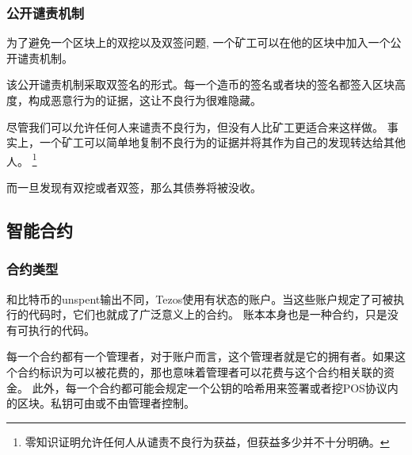 \documentclass[letterpaper]{article}
\begin{document}
\subsubsection{公开谴责机制}
为了避免一个区块上的双挖以及双签问题, 一个矿工可以在他的区块中加入一个公开谴责机制。

该公开谴责机制采取双签名的形式。每一个造币的签名或者块的签名都签入区块高度，构成恶意行为的证据，这让不良行为很难隐藏。

尽管我们可以允许任何人来谴责不良行为，但没有人比矿工更适合来这样做。
事实上，一个矿工可以简单地复制不良行为的证据并将其作为自己的发现转达给其他人。
\footnote{零知识证明允许任何人从谴责不良行为获益，但获益多少并不十分明确。}

而一旦发现有双挖或者双签，那么其债券将被没收。

\subsection{智能合约}

\subsubsection{合约类型}
和比特币的unspent输出不同，Tezos使用有状态的账户。当这些账户规定了可被执行的代码时，它们也就成了广泛意义上的合约。
账本本身也是一种合约，只是没有可执行的代码。

每一个合约都有一个管理者，对于账户而言，这个管理者就是它的拥有者。如果这个合约标识为可以被花费的，那也意味着管理者可以花费与这个合约相关联的资金。
此外，每一个合约都可能会规定一个公钥的哈希用来签署或者挖POS协议内的区块。私钥可由或不由管理者控制。
\end{document}

